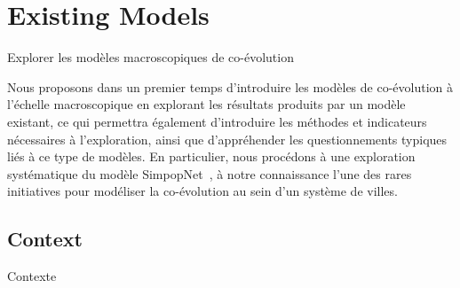 




\newpage


\section{Existing Models}{Explorer les modèles macroscopiques de co-évolution}

\label{sec:macrocoevolexplo}



Nous proposons dans un premier temps d'introduire les modèles de co-évolution à l'échelle macroscopique en explorant les résultats produits par un modèle existant, ce qui permettra également d'introduire les méthodes et indicateurs nécessaires à l'exploration, ainsi que d'appréhender les questionnements typiques liés à ce type de modèles. En particulier, nous procédons à une exploration systématique du modèle SimpopNet~\cite{schmitt2014modelisation}, à notre connaissance l'une des rares initiatives pour modéliser la co-évolution au sein d'un système de villes.



\subsection{Context}{Contexte}


